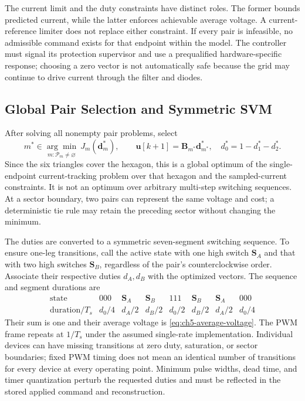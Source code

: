 The current limit and the duty constraints have distinct roles. The former bounds predicted current, while the latter enforces achievable average voltage. A current-reference limiter does not replace either constraint. If every pair is infeasible, no admissible command exists for that endpoint within the model. The controller must signal its protection supervisor and use a prequalified hardware-specific response; choosing a zero vector is not automatically safe because the grid may continue to drive current through the filter and diodes.

\subsection{Global Pair Selection and Symmetric SVM}
After solving all nonempty pair problems, select
\begin{equation}
m^\ast\in\underset{m:\mathcal P_m\ne\varnothing}{\arg\min}\ J_m(\mathbf d_m^\ast),\qquad
\mathbf u[k+1]=\mathbf B_{m^\ast}\mathbf d_{m^\ast}^\ast,\quad
 d_0^\ast=1-d_1^\ast-d_2^\ast.
\label{eq:ch5-global-selection}
\end{equation}
Since the six triangles cover the hexagon, this is a global optimum of the single-endpoint current-tracking problem over that hexagon and the sampled-current constraints. It is not an optimum over arbitrary multi-step switching sequences. At a sector boundary, two pairs can represent the same voltage and cost; a deterministic tie rule may retain the preceding sector without changing the minimum.

The duties are converted to a symmetric seven-segment switching sequence. To ensure one-leg transitions, call the active state with one high switch $\mathbf S_A$ and that with two high switches $\mathbf S_B$, regardless of the pair's counterclockwise order. Associate their respective duties $d_A,d_B$ with the optimized vectors. The sequence and segment durations are
\begin{equation}
\begin{array}{c|ccccccc}
\text{state}&000&\mathbf S_A&\mathbf S_B&111&\mathbf S_B&\mathbf S_A&000\\
\text{duration}/T_s&d_0/4&d_A/2&d_B/2&d_0/2&d_B/2&d_A/2&d_0/4
\end{array}
\label{eq:ch5-svm-sequence}
\end{equation}
Their sum is one and their average voltage is \eqref{eq:ch5-average-voltage}. The PWM frame repeats at $1/T_s$ under the assumed single-rate implementation. Individual devices can have missing transitions at zero duty, saturation, or sector boundaries; fixed PWM timing does not mean an identical number of transitions for every device at every operating point. Minimum pulse widths, dead time, and timer quantization perturb the requested duties and must be reflected in the stored applied command and reconstruction.

